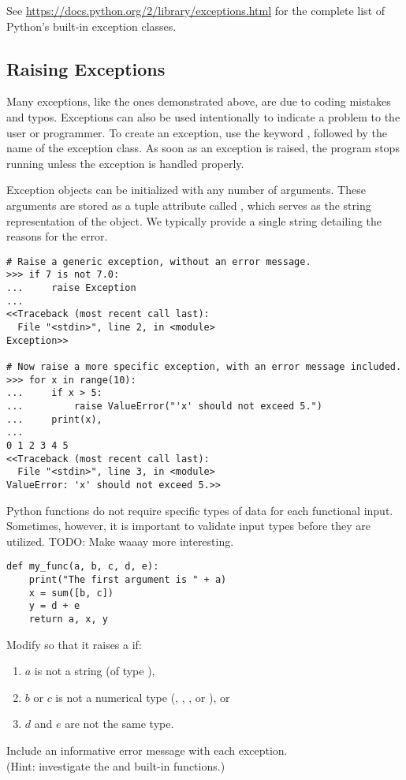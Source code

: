 See \url{https://docs.python.org/2/library/exceptions.html} for the complete list of Python's built-in exception classes.

\subsection*{Raising Exceptions} %

Many exceptions, like the ones demonstrated above, are due to coding mistakes and typos.
Exceptions can also be used intentionally to indicate a problem to the user or programmer.
To create an exception, use the keyword , followed by the name of the exception class.
As soon as an exception is raised, the program stops running unless the exception is handled properly.

Exception objects can be initialized with any number of arguments.
These arguments are stored as a tuple attribute called , which serves as the string representation of the object.
We typically provide a single string detailing the reasons for the error.

\begin{lstlisting}
# Raise a generic exception, without an error message.
>>> if 7 is not 7.0:
...     raise Exception
...
<<Traceback (most recent call last):
  File "<stdin>", line 2, in <module>
Exception>>

# Now raise a more specific exception, with an error message included.
>>> for x in range(10):
...     if x > 5:
...         raise ValueError("'x' should not exceed 5.")
...     print(x),
...
0 1 2 3 4 5
<<Traceback (most recent call last):
  File "<stdin>", line 3, in <module>
ValueError: 'x' should not exceed 5.>>
\end{lstlisting}

\begin{problem} %
Python functions do not require specific types of data for each functional input.
Sometimes, however, it is important to validate input types before they are utilized. TODO: Make  waaay more interesting.
\begin{lstlisting}
def my_func(a, b, c, d, e):
    print("The first argument is " + a)
    x = sum([b, c])
    y = d + e
    return a, x, y
\end{lstlisting}
Modify  so that it raises a  if:
\begin{enumerate}
\item $a$ is not a string (of type ),
\item $b$ or $c$ is not a numerical type (, , , or ), or
\item $d$ and $e$ are not the same type.
\end{enumerate}
Include an informative error message with each exception.
\\
(Hint: investigate the  and  built-in functions.)
\end{problem}

